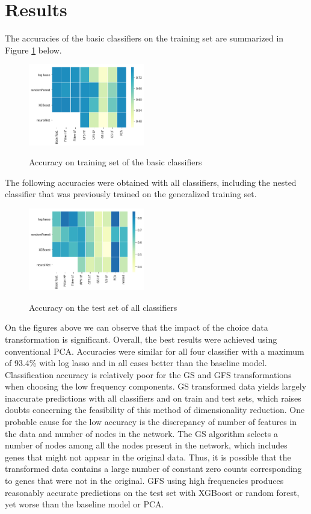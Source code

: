 \documentclass[10pt,conference,compsocconf]{IEEEtran}
\begin{document}
\section*{Results}

The accuracies of the basic classifiers on the training set are summarized in Figure \ref{fig:train_acc} below.
\begin{figure}
	\centering
	\includegraphics[width=0.45\textwidth]{ind_train_perf.png}
	\label{fig:train_acc}
	\caption{Accuracy on training set of the basic classifiers}
\end{figure}
The following accuracies were obtained with all classifiers, including the nested classifier that was previously trained on the generalized training set.
\begin{figure}
	\centering
	\includegraphics[width=0.45\textwidth]{test_perf.png}
	\label{fig:test_acc}
	\caption{Accuracy on the test set of all classifiers }
\end{figure}
On the figures above we can observe that the impact of the choice data transformation is significant. Overall, the best results were achieved using conventional PCA. Accuracies were similar for all four classifier with a maximum of 93.4\% with log lasso and in all cases better than the baseline model.
 Classification accuracy is relatively poor for the GS and GFS transformations when choosing the low frequency components. GS transformed data yields largely inaccurate predictions with all classifiers and on train and test sets, which raises doubts concerning the feasibility of this method of dimensionality reduction. One probable cause for the low accuracy is the discrepancy of number of features in the data and number of nodes in the network. The GS algorithm selects a number of nodes among all the nodes present in the network, which includes genes that might not appear in the original data. Thus, it is possible that the transformed data contains a large number of constant zero counts corresponding to genes that were not in the original. GFS using high frequencies produces reasonably accurate predictions on the test set with XGBoost or random forest, yet worse than the baseline model or PCA. 
\end{document}
